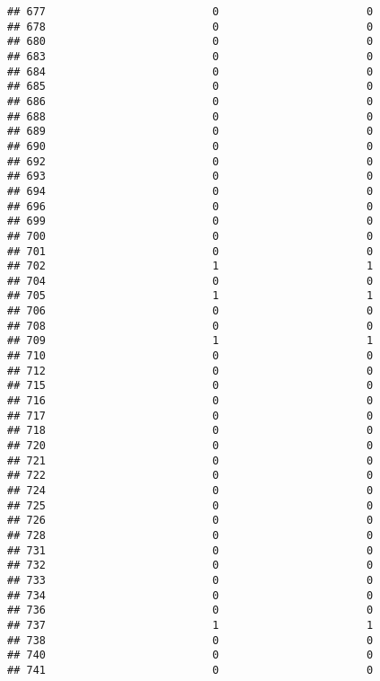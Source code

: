 \documentclass[
]{article}
\begin{document}
\begin{verbatim}
## 677                          0                       0
## 678                          0                       0
## 680                          0                       0
## 683                          0                       0
## 684                          0                       0
## 685                          0                       0
## 686                          0                       0
## 688                          0                       0
## 689                          0                       0
## 690                          0                       0
## 692                          0                       0
## 693                          0                       0
## 694                          0                       0
## 696                          0                       0
## 699                          0                       0
## 700                          0                       0
## 701                          0                       0
## 702                          1                       1
## 704                          0                       0
## 705                          1                       1
## 706                          0                       0
## 708                          0                       0
## 709                          1                       1
## 710                          0                       0
## 712                          0                       0
## 715                          0                       0
## 716                          0                       0
## 717                          0                       0
## 718                          0                       0
## 720                          0                       0
## 721                          0                       0
## 722                          0                       0
## 724                          0                       0
## 725                          0                       0
## 726                          0                       0
## 728                          0                       0
## 731                          0                       0
## 732                          0                       0
## 733                          0                       0
## 734                          0                       0
## 736                          0                       0
## 737                          1                       1
## 738                          0                       0
## 740                          0                       0
## 741                          0                       0

\end{verbatim}
\end{document}
